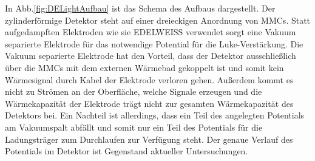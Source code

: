 In Abb.\ref{fig:DELightAufbau} ist das Schema des Aufbaus dargestellt.
Der zylinderförmige Detektor steht auf einer dreieckigen Anordnung von MMCs.
Statt aufgedampften Elektroden wie sie EDELWEISS verwendet sorgt eine Vakuum separierte Elektrode für das notwendige Potential für die Luke-Verstärkung.
Die Vakuum separierte Elektrode hat den Vorteil, dass der Detektor ausschließlich über die MMCs mit dem externen Wärmebad gekoppelt ist und somit kein Wärmesignal durch Kabel der Elektrode verloren gehen.
Außerdem kommt es nicht zu Strömen an der Oberfläche, welche Signale erzeugen und die Wärmekapazität der Elektrode trägt nicht zur gesamten Wärmekapazität des Detektors bei.
Ein Nachteil ist allerdings, dass ein Teil des angelegten Potentials am Vakuumspalt abfällt und somit nur ein Teil des Potentials für die Ladungsträger zum Durchlaufen zur Verfügung steht.
Der genaue Verlauf des Potentials im Detektor ist Gegenstand aktueller Untersuchungen.


